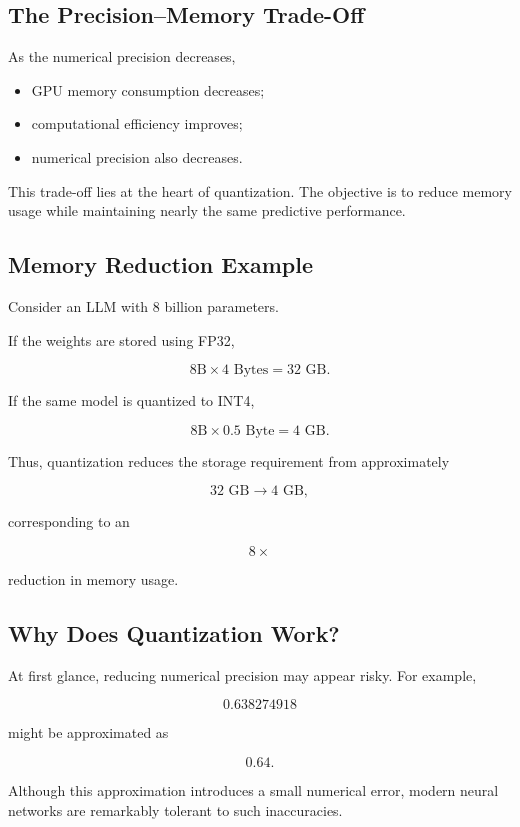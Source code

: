\subsection*{The Precision--Memory Trade-Off}

As the numerical precision decreases,

\begin{itemize}
    \item GPU memory consumption decreases;
    \item computational efficiency improves;
    \item numerical precision also decreases.
\end{itemize}

This trade-off lies at the heart of quantization. The objective is to reduce memory usage while maintaining nearly the same predictive performance.
\subsection*{Memory Reduction Example}

Consider an LLM with 8 billion parameters.

If the weights are stored using FP32,

\[
8\text{B}
\times
4\text{ Bytes}
=
32\text{ GB}.
\]

If the same model is quantized to INT4,

\[
8\text{B}
\times
0.5\text{ Byte}
=
4\text{ GB}.
\]

Thus, quantization reduces the storage requirement from approximately

\[
32\text{ GB}
\rightarrow
4\text{ GB},
\]

corresponding to an

\[
8\times
\]

reduction in memory usage.
\subsection*{Why Does Quantization Work?}

At first glance, reducing numerical precision may appear risky. For example,

\[
0.638274918
\]

might be approximated as

\[
0.64.
\]

Although this approximation introduces a small numerical error, modern neural networks are remarkably tolerant to such inaccuracies.

